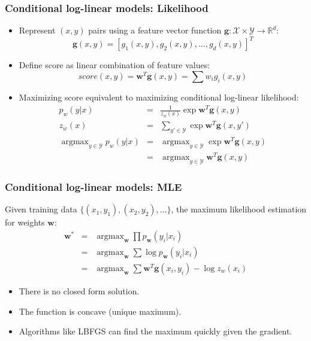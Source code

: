 \documentclass[ignorenonframetext,plain]{beamer}
\DeclareMathOperator*{\argmax}{argmax}
\newcommand{\score}{\mathit{score}}
\begin{document}
\begin{frame}\frametitle{Conditional log-linear models: Likelihood}
\begin{itemize}
\item Represent $(x, y)$ pairs using a feature vector function
  $\mathbf{g}: \mathcal{X} \times \mathcal{Y} \rightarrow
  \mathbb{R}^d:$ \[
\mathbf{g}(x, y) = [ g_1(x, y), g_2(x, y), \dots, g_d(x, y) ]^T
\]

\item Define score as linear combination of feature values: \[
  \score(x, y) = \mathbf{w}^T \mathbf{g}(x, y) = \sum w_i g_i(x, y)
\]

\item Maximizing score equivalent to maximizing conditional log-linear
  likelihood:
\begin{eqnarray*}
  p_w(y|x) &=& \frac{1}{z_w(x)}\exp \mathbf{w}^T \mathbf{g}(x, y) \\
  z_w(x) &=& \sum_{y'\in\mathcal{Y}} \exp \mathbf{w}^T \mathbf{g}(x, y') \\
  \argmax_{y\in\mathcal{Y}} p_w(y|x)
    &=& \argmax_{y\in\mathcal{Y}} \exp \mathbf{w}^T \mathbf{g}(x, y) \\
    &=& \argmax_{y\in\mathcal{Y}} \mathbf{w}^T \mathbf{g}(x, y)
\end{eqnarray*}
\end{itemize}
\end{frame}

\begin{frame}\frametitle{Conditional log-linear models: MLE}
Given training data $\{(x_1, y_1), (x_2, y_2), \dots \}$, the
maximum likelihood estimation for weights $\mathbf{w}$: \begin{eqnarray*}
\mathbf{w^*} &=& \argmax_\mathbf{w} \prod p_\mathbf{w}(y_i | x_i) \\
&=& \argmax_\mathbf{w} \sum \log p_\mathbf{w}(y_i | x_i) \\
&=& \argmax_\mathbf{w} \sum \mathbf{w}^T \mathbf{g}(x_i, y_i) - \log z_w(x_i)
\end{eqnarray*}
\begin{itemize}
\item There is no closed form solution.
\item The function is concave (unique maximum).
\item Algorithms like LBFGS can find the maximum quickly given the
  gradient.
\end{itemize}
\end{frame}
\end{document}
